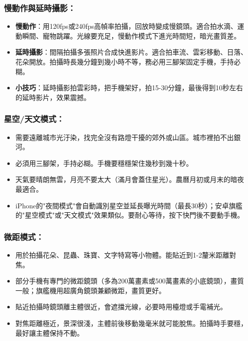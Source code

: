 \subsubsection*{慢動作與延時攝影：}

\begin{itemize}
  \item \textbf{慢動作}：用120fps或240fps高幀率拍攝，回放時變成慢鏡頭。適合拍水滴、運動瞬間、寵物跳躍。光線要充足，慢動作模式下進光時間短，暗光畫質差。
  \item \textbf{延時攝影}：間隔拍攝多張照片合成快進影片。適合拍車流、雲彩移動、日落、花朵開放。拍攝時長幾分鐘到幾小時不等，務必用三腳架固定手機，手持必糊。
  \item \textbf{小技巧}：延時攝影拍雲彩時，把手機架好，拍15-30分鐘，最後得到10秒左右的延時影片，效果震撼。
\end{itemize}

\subsubsection*{星空/天文模式：}

\begin{itemize}
  \item 需要遠離城市光汙染，找完全沒有路燈干擾的郊外或山區。城市裡拍不出銀河。
  \item 必須用三腳架，手持必糊。手機要穩穩架住幾秒到幾十秒。
  \item 天氣要晴朗無雲，月亮不要太大（滿月會蓋住星光）。農曆月初或月末的暗夜最適合。
  \item iPhone的"夜間模式"會自動識別星空並延長曝光時間（最長30秒）；安卓旗艦的"星空模式"或"天文模式"效果類似。要耐心等待，按下快門後不要動手機。
\end{itemize}

\subsubsection*{微距模式：}

\begin{itemize}
  \item 用於拍攝花朵、昆蟲、珠寶、文字特寫等小物體。能貼近到1-2釐米距離對焦。
  \item 部分手機有專門的微距鏡頭（多為200萬畫素或500萬畫素的小底鏡頭），畫質一般；旗艦機用超廣角鏡頭兼顧微距，畫質更好。
  \item 貼近拍攝時鏡頭離主體很近，會遮擋光線，必要時用檯燈或手電補光。
  \item 對焦距離極近，景深很淺，主體前後移動幾毫米就可能脫焦。拍攝時手要穩，最好讓主體保持不動。
\end{itemize}

